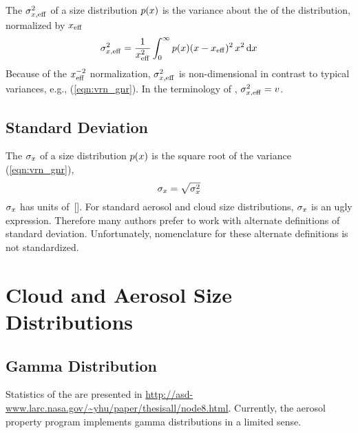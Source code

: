 \documentclass[12pt,twoside]{article}
\newcommand{\vrnffcxxx}{\sdn_{\xxx,\mathrm{eff}}^{2}}
\newcommand{\vrnxxx}{\sdn_{\xxx}^{2}}
\newcommand{\xxxeff}{\xxx_\mathrm{eff}}
\begin{document}
The  $\vrnffcxxx$ of a size distribution 
$p(x)$ is the variance about the  of
the distribution, normalized by $\xxxeff$ \cite[e.g.,][]{HaT74}  
\begin{equation}
\vrnffcxxx = \frac{1}{\xxxeff^{2}} 
\int_{0}^{\infty} \pdffnc(\xxx) (\xxx - \xxxeff)^{2} \, \xxx^{2} \,\dfr\xxx
\label{eqn:vrnffc_gnr}
\end{equation}
Because of the $\xxxeff^{-2}$ normalization, $\vrnffcxxx$ is
non-dimensional in contrast to typical variances, e.g.,
(\ref{eqn:vrn_gnr}). 
In the terminology of \cite{HaT74}, $\vrnffcxxx = v$.

\subsection[Standard Deviation]{Standard Deviation}
The  $\sigma_{x}$ of a size distribution
$p(x)$ is the square root of the variance (\ref{eqn:vrn_gnr}),  
\begin{equation}
\sdnxxx = \sqrt{\vrnxxx}
\label{eqn:sdn_gnr}
\end{equation}
$\sigma_{x}$ has units of~[\m].
For standard aerosol and cloud size distributions, $\sigma_{x}$ is an
ugly expression.
Therefore many authors prefer to work with alternate definitions of
standard deviation.
Unfortunately, nomenclature for these alternate definitions is not
standardized. 

\section{Cloud and Aerosol Size Distributions}\label{sxn:psd}

\subsection{\normalsize Gamma Distribution}\label{sxn:psd_gmm}
Statistics of the  are presented in
\url{http://asd-www.larc.nasa.gov/~yhu/paper/thesisall/node8.html}.
Currently, the aerosol property program  implements gamma
distributions in a limited sense.
\end{document}
